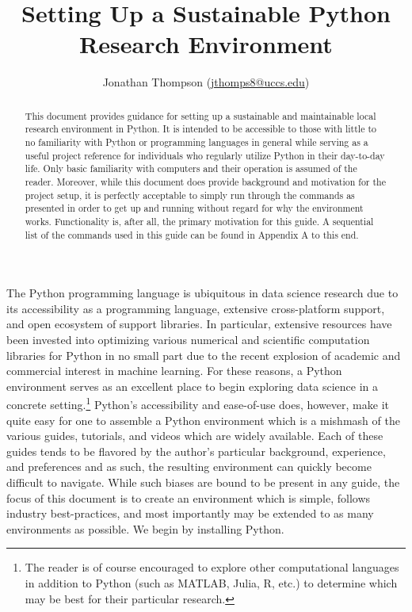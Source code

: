 \documentclass[12pt]{article}
\begin{document}
\title{Setting Up a Sustainable Python Research Environment}
\author{Jonathan Thompson (\href{mailto:jthomps8@uccs.edu}{jthomps8@uccs.edu})}

\maketitle%

\begin{abstract}
\noindent This document provides guidance for setting up a sustainable and maintainable local research environment
in Python. It is intended to be accessible to those with little to no familiarity with Python or programming languages
in general while serving as a useful project reference for individuals who regularly utilize Python in their
day-to-day life. Only basic familiarity with computers and their operation is assumed of the reader. Moreover, while
this document does provide background and motivation for the project setup, it is perfectly acceptable to simply run
through the commands as presented in order to get up and running without regard for why the environment works.
Functionality is, after all, the primary motivation for this guide. A sequential list of the commands used in this guide
can be found in Appendix A to this end.

\end{abstract}


The Python programming language is ubiquitous in data science research due to its accessibility as a programming
language, extensive cross-platform support, and open ecosystem of support libraries. In particular, extensive resources
have been invested into optimizing various numerical and scientific computation libraries for Python in no small part
due to the recent explosion of academic and commercial interest in machine learning. For these reasons, a Python
environment serves as an excellent place to begin exploring data science in a concrete setting.\footnote{The reader is
of course encouraged to explore other computational languages in addition to Python (such as MATLAB, Julia, R, etc.) to
determine which may be best for their particular research.} Python's accessibility and ease-of-use does, however, make
it quite easy for one to assemble a Python environment which is a mishmash of the various guides, tutorials, and videos
which are widely available. Each of these guides tends to be flavored by the author's particular background, experience,
and preferences and as such, the resulting environment can quickly become difficult to navigate. While such biases are
bound to be present in any guide, the focus of this document is to create an environment which is simple,
follows industry best-practices, and most importantly may be extended to as many environments as possible.
We begin by installing Python.
\end{document}
